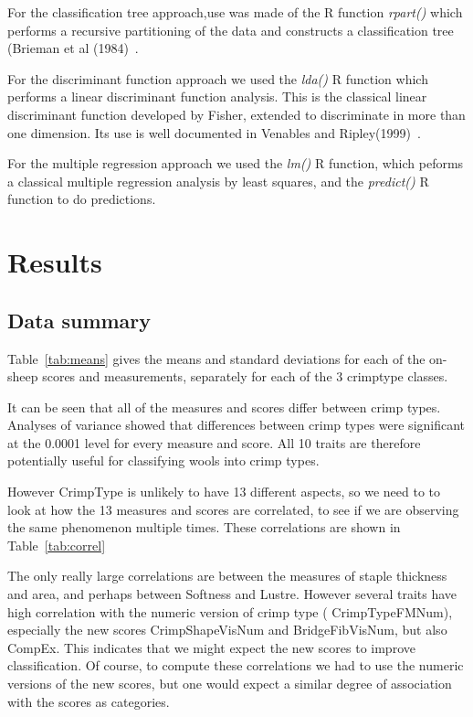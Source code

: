 \documentclass[titlepage]{article}  %
\begin{document}
 For the classification tree approach,use was  made of the R function {\em rpart()} which performs a recursive partitioning of the data and constructs a classification tree (Brieman et al (1984)~\cite{brei:84}.

 For the discriminant function approach we used the {\em lda()} R function which performs a linear discriminant function analysis. This is the classical linear discriminant function developed by Fisher, extended to discriminate in more than one dimension. Its use is well documented in Venables and Ripley(1999)~\cite{vena:99}.

 For the multiple regression approach we used the {\em lm()} R function, which peforms a classical multiple regression analysis by least squares, and the {\em predict()} R function to do predictions.


\section{Results}
\subsection{Data summary}
Table~\ref{tab:means} gives the means and standard deviations for each of the on-sheep scores and measurements, separately for each of the 3 crimptype classes.

It can be seen that all of the measures and scores differ between crimp types. Analyses of variance showed that differences between crimp types were significant at the 0.0001 level for every measure and score. All 10 traits are therefore potentially useful for classifying wools into crimp types. 

However CrimpType is unlikely to have 13 different aspects, so we need to to look at how the 13 measures and scores are correlated, to see if we are observing the same phenomenon multiple times. These correlations are shown in Table~\ref{tab:correl}

The only really large correlations are between the measures of staple thickness and area, and perhaps between Softness and Lustre. However several traits have high correlation with the numeric version of crimp type ( CrimpTypeFMNum), especially the new scores CrimpShapeVisNum and BridgeFibVisNum, but also CompEx. This indicates that we might expect the new scores to improve classification. Of course, to compute these correlations we had to use the numeric versions of the new scores, but one would expect a similar degree of association with the scores as categories.
\end{document}
